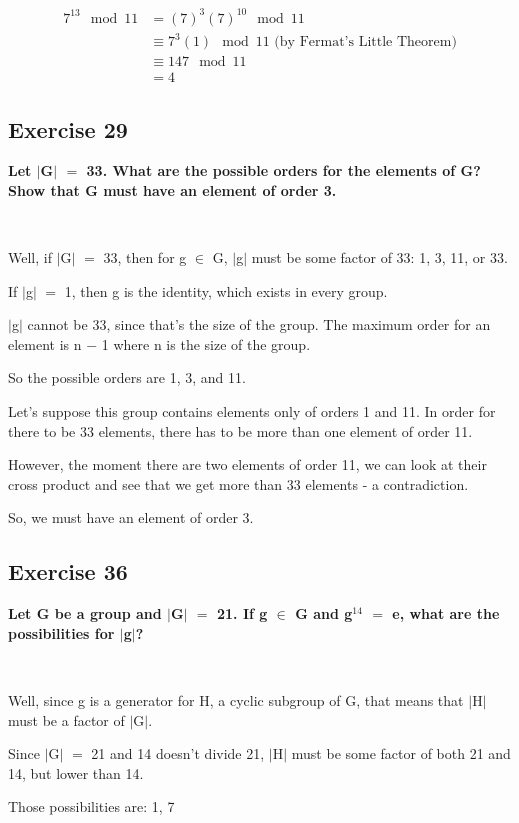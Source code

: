 \documentclass{article}
\newcommand{\mt}[1]{\ensuremath{#1}}
\newcommand\ssc[2][\DefaultOpt]{%
  \def\DefaultOpt{#2}%
  \subsection[#1]{#2}%
}
\newcommand{\mem}{\mt{\in} }
\newcommand{\av}[1]{\mt{|}#1\mt{|}}  %
\newcommand{\ms}{\mt{-} }
\newcommand{\eql}{\mt{=} }
\newcommand{\uf}[2]{#1\mt{^{#2}}}
\newcommand{\eqn}[1]{\[#1\]}
\newcommand{\splt}[1]{\begin{split}#1\end{split}}
\begin{document}
{{\eqn{
	\splt{
		7^{13}\mod 11 & = (7)^3(7)^{10} \mod 11 \\
		& \equiv 7^3(1) \mod 11 \textrm{ (by Fermat's Little Theorem)} \\
		& \equiv 147 \mod 11 \\
		& = 4
	}
}
}
\ssc{Exercise 29}{

\textbf{Let \av{G} \eql 33. What are the possible orders for the elements of G? Show that G must have an element of order 3.}

\

Well, if \av{G} \eql 33, then for g \mem G, \av{g} must be some factor of 33: 1, 3, 11, or 33.

If \av{g} \eql 1, then g is the identity, which exists in every group.

\av{g} cannot be 33, since that's the size of the group. The maximum order for an element is n \ms 1 where n is the size of the group.

So the possible orders are 1, 3, and 11.

Let's suppose this group contains elements only of orders 1 and 11. In order for there to be 33 elements, there has to be more than one element of order 11.

However, the moment there are two elements of order 11, we can look at their cross product and see that we get more than 33 elements - a contradiction.

So, we must have an element of order 3.

}
\ssc{Exercise 36}{
\textbf{Let G be a group and \av{G} \eql 21. If g \mem G and \uf{g}{14} \eql e, what are the possibilities for \av{g}?}

\

Well, since g is a generator for H, a cyclic subgroup of G, that means that \av{H} must be a factor of \av{G}.

Since \av{G} \eql 21 and 14 doesn't divide 21, \av{H} must be some factor of both 21 and 14, but lower than 14.

Those possibilities are: 1, 7 
}
}
\end{document}
